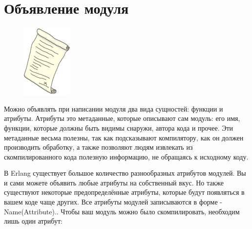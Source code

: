 \documentclass[a4paper,12pt]{report}
\newcommand{\ops}{\colorbox{lgreen}}
\begin{document}
\section{Объявление модуля}
\begin{figure}
    \includegraphics[width=1\linewidth]{declaration.png}
\end{figure}
Можно объявлять при написании модуля два вида сущностей: функции и атрибуты. Атрибуты это метаданные, которые описывают сам модуль: его имя, функции, которые должны быть видимы снаружи, автора кода и прочее. Эти метаданные весьма полезны, так как подсказывают компилятору, как он должен производить обработку, а также позволяют людям извлекать из скомпилированного кода полезную информацию, не обращаясь к исходному коду.

В Erlang существует большое количество разнообразных атрибутов модулей. Вы и сами можете объявить любые атрибуты на собственный вкус. Но также существуют некоторые предопределённые атрибуты, которые будут появляться в вашем коде чаще других. Все атрибуты модулей записываются в форме \ops{-Name(Attribute).}. Чтобы ваш модуль можно было скомпилировать, необходим лишь один атрибут:
\end{document}

